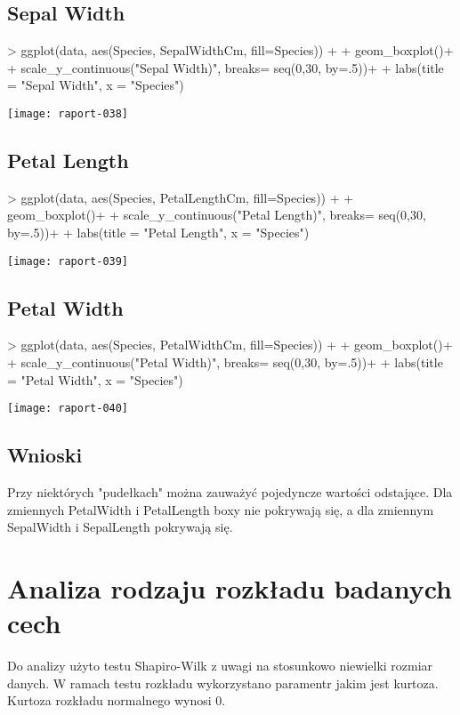 \documentclass{article}
\begin{document}
\subsection{Sepal Width}
\begin{Schunk}
\begin{Sinput}
> ggplot(data, aes(Species, SepalWidthCm, fill=Species)) + 
+   geom_boxplot()+
+   scale_y_continuous("Sepal Width)", breaks= seq(0,30, by=.5))+
+   labs(title = "Sepal Width", x = "Species")
\end{Sinput}
\end{Schunk}
\texttt{[image: raport-038]}
\newpage

\subsection{Petal Length}
\begin{Schunk}
\begin{Sinput}
> ggplot(data, aes(Species, PetalLengthCm, fill=Species)) + 
+   geom_boxplot()+
+   scale_y_continuous("Petal Length)", breaks= seq(0,30, by=.5))+
+   labs(title = "Petal Length", x = "Species")
\end{Sinput}
\end{Schunk}
\texttt{[image: raport-039]}
\newpage

\subsection{Petal Width}
\begin{Schunk}
\begin{Sinput}
> ggplot(data, aes(Species, PetalWidthCm, fill=Species)) + 
+   geom_boxplot()+
+   scale_y_continuous("Petal Width)", breaks= seq(0,30, by=.5))+
+   labs(title = "Petal Width", x = "Species")
\end{Sinput}
\end{Schunk}
\texttt{[image: raport-040]}
\subsection{Wnioski}

Przy niektórych "pudełkach" można zauważyć pojedyncze wartości odstające. Dla zmiennych PetalWidth i PetalLength boxy nie pokrywają się, a dla zmiennym SepalWidth i SepalLength pokrywają się.


\newpage

\section{Analiza rodzaju rozkładu badanych cech}
Do analizy użyto testu Shapiro-Wilk z uwagi na stosunkowo niewielki rozmiar danych. W ramach testu rozkładu wykorzystano paramentr jakim jest kurtoza. Kurtoza rozkładu normalnego wynosi 0.
\end{document}
